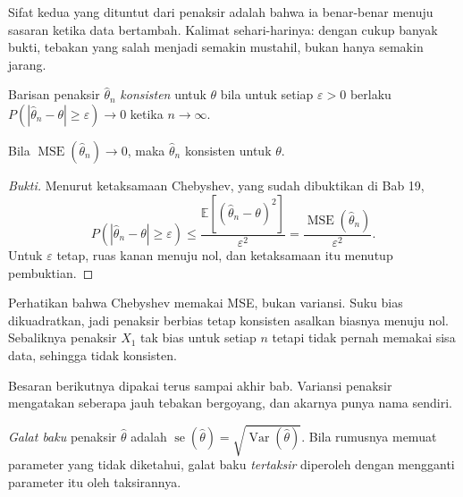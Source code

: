 Sifat kedua yang dituntut dari penaksir adalah bahwa ia benar-benar menuju sasaran
ketika data bertambah. Kalimat sehari-harinya: dengan cukup banyak bukti, tebakan yang
salah menjadi semakin mustahil, bukan hanya semakin jarang.

\begin{definisi}[Konsisten]
Barisan penaksir $\hat\theta_n$ \emph{konsisten} untuk $\theta$ bila untuk setiap
$\varepsilon>0$ berlaku $P(|\hat\theta_n-\theta|\ge\varepsilon)\to0$ ketika
$n\to\infty$.
\end{definisi}

\begin{proposisi}
Bila $\operatorname{MSE}(\hat\theta_n)\to0$, maka $\hat\theta_n$ konsisten untuk
$\theta$.
\end{proposisi}

\begin{proof}[Bukti]
Menurut ketaksamaan Chebyshev, yang sudah dibuktikan di Bab 19,
\[
P(|\hat\theta_n-\theta|\ge\varepsilon)
\le\frac{\mathbb{E}[(\hat\theta_n-\theta)^2]}{\varepsilon^2}
=\frac{\operatorname{MSE}(\hat\theta_n)}{\varepsilon^2}.
\]
Untuk $\varepsilon$ tetap, ruas kanan menuju nol, dan ketaksamaan itu menutup
pembuktian.
\end{proof}

Perhatikan bahwa Chebyshev memakai MSE, bukan variansi. Suku bias dikuadratkan, jadi
penaksir berbias tetap konsisten asalkan biasnya menuju nol. Sebaliknya penaksir $X_1$
tak bias untuk setiap $n$ tetapi tidak pernah memakai sisa data, sehingga tidak
konsisten.

Besaran berikutnya dipakai terus sampai akhir bab. Variansi penaksir mengatakan
seberapa jauh tebakan bergoyang, dan akarnya punya nama sendiri.


\begin{definisi}
\emph{Galat baku} penaksir $\hat\theta$ adalah $\operatorname{se}(\hat\theta)
=\sqrt{\operatorname{Var}(\hat\theta)}$. Bila rumusnya memuat parameter yang tidak
diketahui, galat baku \emph{tertaksir} diperoleh dengan mengganti parameter itu oleh
taksirannya.
\end{definisi}

